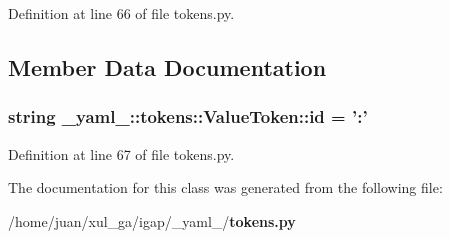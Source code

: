 Definition at line 66 of file tokens.py.

\subsection{Member Data Documentation}
\subsubsection{\setlength{\rightskip}{0pt plus 5cm}string {\bf \_\-yaml\_\-::tokens::ValueToken::id} = ':'\hspace{0.3cm}{\tt  [static]}}\label{class__yaml___1_1tokens_1_1ValueToken_124c9a377ca712a566ba2155373cdde9}




Definition at line 67 of file tokens.py.

The documentation for this class was generated from the following file:\begin{CompactItemize}
\item 
/home/juan/xul\_\-ga/igap/\_\-yaml\_\-/{\bf tokens.py}\end{CompactItemize}
